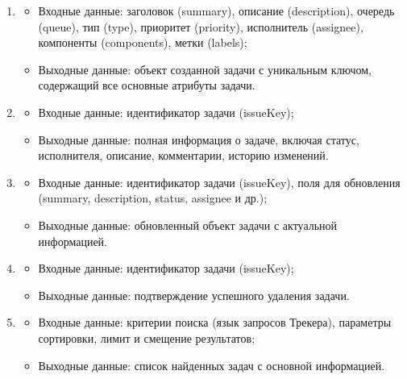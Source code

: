\documentclass[utf8, russian]{eskdtext}
\begin{document}
\begin{enumerate}
    \item {}
    \begin{itemize}
        \item Входные данные: заголовок (summary), описание (description), очередь (queue), тип (type), приоритет (priority), исполнитель (assignee), компоненты (components), метки (labels);
        \item Выходные данные: объект созданной задачи с уникальным ключом, содержащий все основные атрибуты задачи.
    \end{itemize}
    
    \item {}
    \begin{itemize}
        \item Входные данные: идентификатор задачи (issueKey);
        \item Выходные данные: полная информация о задаче, включая статус, исполнителя, описание, комментарии, историю изменений.
    \end{itemize}
    
    \item {}
    \begin{itemize}
        \item Входные данные: идентификатор задачи (issueKey), поля для обновления (summary, description, status, assignee и др.);
        \item Выходные данные: обновленный объект задачи с актуальной информацией.
    \end{itemize}
    
    \item {}
    \begin{itemize}
        \item Входные данные: идентификатор задачи (issueKey);
        \item Выходные данные: подтверждение успешного удаления задачи.
    \end{itemize}
    
    \item {}
    \begin{itemize}
        \item Входные данные: критерии поиска (язык запросов Трекера), параметры сортировки, лимит и смещение результатов;
        \item Выходные данные: список найденных задач с основной информацией.
    \end{itemize}
    

\end{enumerate}
\end{document}
